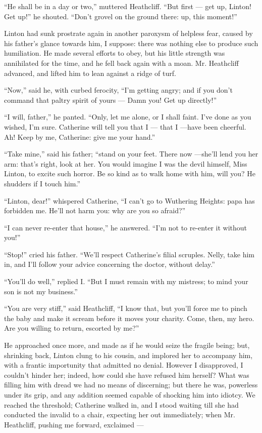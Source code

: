\par “He shall be in a day or two,” muttered Heathcliff. “But first — get up, Linton! Get up!” he shouted. “Don't grovel on the ground there: up, this moment!”
\par Linton had sunk prostrate again in another paroxysm of helpless fear, caused by his father's glance towards him, I suppose: there was nothing else to produce such humiliation. He made several efforts to obey, but his little strength was annihilated for the time, and he fell back again with a moan. Mr. Heathcliff advanced, and lifted him to lean against a ridge of turf.
\par “Now,” said he, with curbed ferocity, “I'm getting angry; and if you don't command that paltry spirit of yours — Damn you! Get up directly!”
\par “I will, father,” he panted. “Only, let me alone, or I shall faint. I've done as you wished, I'm sure. Catherine will tell you that I — that I —have been cheerful. Ah! Keep by me, Catherine: give me your hand.”
\par “Take mine,” said his father; “stand on your feet. There now —she'll lend you her arm: that's right, look at her. You would imagine I was the devil himself, Miss Linton, to excite such horror. Be so kind as to walk home with him, will you? He shudders if I touch him.”
\par “Linton, dear!” whispered Catherine, “I can't go to Wuthering Heights: papa has forbidden me. He'll not harm you: why are you so afraid?”
\par “I can never re-enter that house,” he answered. “I'm not to re-enter it without you!”
\par “Stop!” cried his father. “We'll respect Catherine's filial scruples. Nelly, take him in, and I'll follow your advice concerning the doctor, without delay.”
\par “You'll do well,” replied I. “But I must remain with my mistress; to mind your son is not my business.”
\par “You are very stiff,” said Heathcliff, “I know that, but you'll force me to pinch the baby and make it scream before it moves your charity. Come, then, my hero. Are you willing to return, escorted by me?”
\par He approached once more, and made as if he would seize the fragile being; but, shrinking back, Linton clung to his cousin, and implored her to accompany him, with a frantic importunity that admitted no denial. However I disapproved, I couldn't hinder her; indeed, how could she have refused him herself? What was filling him with dread we had no means of discerning; but there he was, powerless under its grip, and any addition seemed capable of shocking him into idiotcy. We reached the threshold; Catherine walked in, and I stood waiting till she had conducted the invalid to a chair, expecting her out immediately; when Mr. Heathcliff, pushing me forward, exclaimed —
